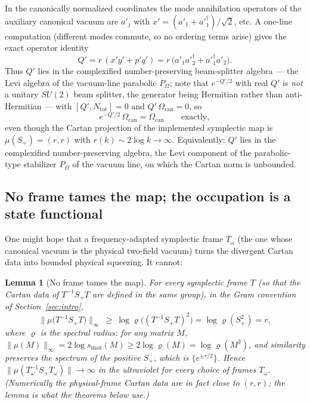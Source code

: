 \documentclass[11pt]{article}
\newtheorem{lemma}[theorem]{Lemma}
\theoremstyle{definition}
\theoremstyle{remark}
\newcommand{\w}{\omega}
\newcommand{\dg}{\dagger}
\begin{document}
In the canonically normalized coordinates the mode annihilation operators
of the auxiliary canonical vacuum are $a'_j$ with
$x'=(a'_1+a'^{\dg}_1)/\sqrt2$, etc.  A one-line computation (different
modes commute, so no ordering terms arise) gives the exact operator
identity
\begin{equation}\label{eq:beamsplitter}
Q'=r\,(x'y'+p'q')=r\,\big(a'_1a'^{\dg}_2+a'^{\dg}_1a'_2\big).
\end{equation}
Thus $Q'$ lies in the complexified number-preserving beam-splitter
algebra --- the Levi algebra of the vacuum-line parabolic $P_\Omega$;
note that $e^{-Q'/2}$ with real $Q'$ is \emph{not} a unitary $SU(2)$
beam splitter, the generator being Hermitian rather than
anti-Hermitian --- with $[Q',N_{\mathrm{tot}}]=0$ and
$Q'\,\Omega_{\mathrm{can}}=0$, so
\begin{equation}
e^{-Q'/2}\,\Omega_{\mathrm{can}}=\Omega_{\mathrm{can}}
\qquad\text{exactly},
\end{equation}
even though the Cartan projection of the implemented symplectic map is
$\mu(S_+)=(r,r)$ with $r(k)\sim2\log k\to\infty$.  Equivalently: $Q'$
lies in the complexified number-preserving algebra, the Levi component of
the parabolic-type stabilizer $P_\Omega$ of the vacuum line, on which the
Cartan norm is unbounded.

\subsection{No frame tames the map; the occupation is a state functional}

One might hope that a frequency-adapted symplectic frame $T_\w$ (the one
whose canonical vacuum is the physical two-field vacuum) turns the
divergent Cartan data into bounded physical squeezing.  It cannot:

\begin{lemma}[No frame tames the map]\label{lem:noframe}
For every symplectic frame $T$ (so that the Cartan data of
$T^{-1}S_+T$ are defined in the same group), in the Gram convention of
Section~\ref{sec:intro},
\begin{equation}
\big\|\mu\big(T^{-1}S_+T\big)\big\|_\infty
\ \ge\ \log\varrho\big((T^{-1}S_+T)^2\big)=\log\varrho(S_+^2)=r ,
\end{equation}
where $\varrho$ is the spectral radius: for any matrix $M$,
$\|\mu(M)\|_\infty=2\log s_{\max}(M)\ge2\log\varrho(M)
=\log\varrho(M^2)$, and similarity preserves the spectrum of the
positive $S_+$, which is $\{e^{\pm r/2}\}$.  Hence
$\|\mu(T_\w^{-1}S_+T_\w)\|\to\infty$ in the ultraviolet for every choice
of frames $T_\w$.  (Numerically the physical-frame Cartan data are in
fact close to $(r,r)$; the lemma is what the theorems below use.)
\end{lemma}
\end{document}
